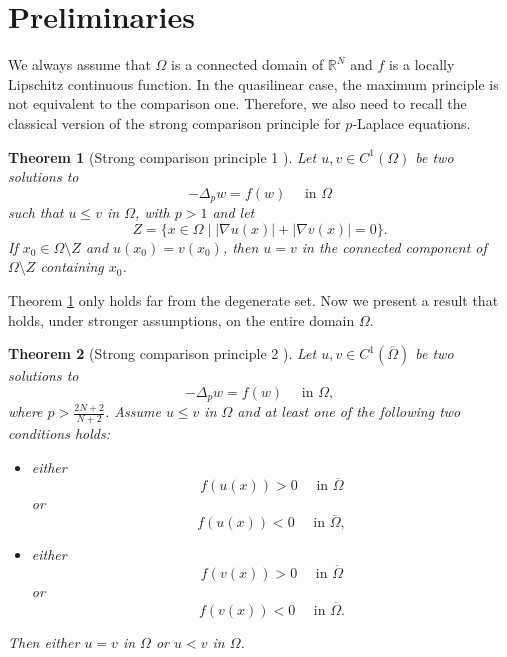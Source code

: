 \documentclass[reqno]{amsart}
\theoremstyle{plain}
\newtheorem{theorem}{Theorem}
\theoremstyle{definition}
\theoremstyle{remark}
\begin{document}
	\section{Preliminaries}\label{sect2}
	
	We always assume that $\Omega$ is a connected domain of $\mathbb{R}^N$ and $f$ is a locally Lipschitz continuous function.
	In the quasilinear case, the maximum principle is not equivalent to the comparison one. Therefore, we also need to recall the classical version of the strong comparison principle for $p$-Laplace equations.
	\begin{theorem}[Strong comparison principle 1 \cite{MR1632933}]\label{th:cscp}
		Let $u,v\in C^1(\Omega)$ be two solutions to
		\[
		-\Delta_p w = f(w) \quad\text{ in } \Omega
		\]
		such that $u \le v$ in $\Omega$, with $p>1$ and let
		\[
		Z=\{x\in\Omega \mid |\nabla u(x)|+|\nabla v(x)|=0\}.
		\]
		If $x_0\in\Omega\setminus Z$ and $u(x_0)=v(x_0)$, then $u=v$ in the connected component of $\Omega\setminus Z$ containing $x_0$.
	\end{theorem}
	
	Theorem \ref{th:cscp} only holds far from the degenerate set. Now we present a result that holds, under stronger assumptions, on the entire domain $\Omega$.
	\begin{theorem}[Strong comparison principle 2 \cite{MR2096703}]\label{th:scp}
		Let $u,v\in C^1(\overline{\Omega})$ be two solutions to
		\[
		-\Delta_p w = f(w) \quad\text{ in } \Omega,
		\]
		where $p > \frac{2N+2}{N+2}$. Assume $u\le v$ in $\Omega$ and at least one of the following two conditions holds:
		\begin{itemize}
			\item[(i)] either
			\[
			f(u(x)) > 0 \quad\text{ in } \overline{\Omega}
			\]
			or
			\[
			f(u(x)) < 0 \quad\text{ in } \overline{\Omega},
			\]
			\item[(ii)] either
			\[
			f(v(x)) > 0 \quad\text{ in } \overline{\Omega}
			\]
			or
			\[
			f(v(x)) < 0 \quad\text{ in } \overline{\Omega}.
			\]
		\end{itemize}
		Then either $u=v$ in $\Omega$ or $u<v$ in $\Omega$.
	\end{theorem}
	
\end{document}
